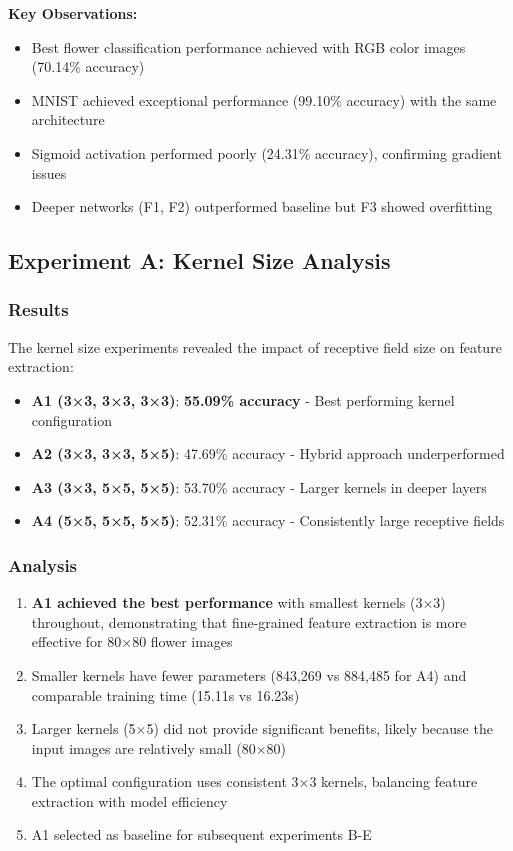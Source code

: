 \documentclass[12pt,a4paper]{article}
\begin{document}
\textbf{Key Observations:}
\begin{itemize}
    \item Best flower classification performance achieved with RGB color images (70.14\% accuracy)
    \item MNIST achieved exceptional performance (99.10\% accuracy) with the same architecture
    \item Sigmoid activation performed poorly (24.31\% accuracy), confirming gradient issues
    \item Deeper networks (F1, F2) outperformed baseline but F3 showed overfitting
\end{itemize}

\subsection{Experiment A: Kernel Size Analysis}

\subsubsection{Results}
The kernel size experiments revealed the impact of receptive field size on feature extraction:

\begin{itemize}
    \item \textbf{A1 (3×3, 3×3, 3×3)}: \textbf{55.09\% accuracy} - Best performing kernel configuration
    \item \textbf{A2 (3×3, 3×3, 5×5)}: 47.69\% accuracy - Hybrid approach underperformed
    \item \textbf{A3 (3×3, 5×5, 5×5)}: 53.70\% accuracy - Larger kernels in deeper layers
    \item \textbf{A4 (5×5, 5×5, 5×5)}: 52.31\% accuracy - Consistently large receptive fields
\end{itemize}

\subsubsection{Analysis}
\begin{enumerate}
    \item \textbf{A1 achieved the best performance} with smallest kernels (3×3) throughout, demonstrating that fine-grained feature extraction is more effective for 80×80 flower images
    \item Smaller kernels have fewer parameters (843,269 vs 884,485 for A4) and comparable training time (15.11s vs 16.23s)
    \item Larger kernels (5×5) did not provide significant benefits, likely because the input images are relatively small (80×80)
    \item The optimal configuration uses consistent 3×3 kernels, balancing feature extraction with model efficiency
    \item A1 selected as baseline for subsequent experiments B-E
\end{enumerate}
\end{document}
